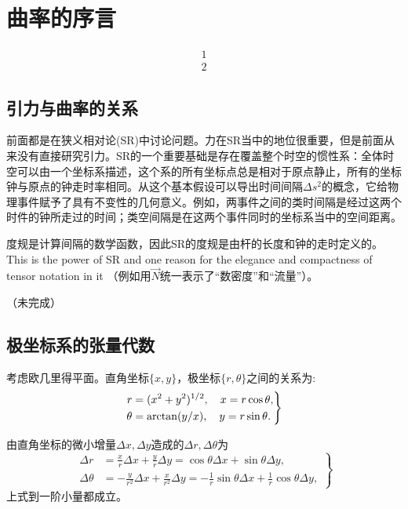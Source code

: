 \chapter{曲率的序言}
\label{chap5}

\begin{align}
    1\\2
\end{align}

\section{引力与曲率的关系}
\label{sec5.1}
前面都是在狭义相对论(SR)中讨论问题。力在SR当中的地位很重要，但是前面从来没有直接研究引力。SR的一个重要基础是存在覆盖整个时空的惯性系：全体时空可以由一个坐标系描述，这个系的所有坐标点总是相对于原点静止，所有的坐标钟与原点的钟走时率相同。从这个基本假设可以导出时间间隔$\Delta s^2$的概念，它给物理事件赋予了具有不变性的几何意义。例如，两事件之间的类时间隔是经过这两个时件的钟所走过的时间；类空间隔是在这两个事件同时的坐标系当中的空间距离。

度规是计算间隔的数学函数，因此SR的度规是由杆的长度和钟的走时定义的。  This is the power of SR and one reason for the elegance and compactness of tensor notation in it （例如用$\vec{N}$统一表示了“数密度”和“流量”）。

（未完成）

\section{极坐标系的张量代数}
\label{sec5.2}
考虑欧几里得平面。直角坐标$\{x, y\}$，极坐标$\{r, \theta\}$之间的关系为:
\begin{equation}
    \left.
    \begin{split}
    r &= (x^2 + y^2)^{1/2}, \quad x = r \cos \theta, \\
    \theta &= \operatorname{\mathrm{arctan}} (y / x), \quad y = r \sin \theta.
    \end{split}
    \right\}
\label{equ5.3}
\end{equation}

由直角坐标的微小增量$\Delta x, \Delta y$造成的$\Delta r, \Delta \theta$为
\begin{equation}
\left.
\begin{split}
    \Delta r &= \frac{x}{r} \Delta x + \frac{y}{r} \Delta y = \cos \theta \Delta x + \sin \theta \Delta y, \\
    \Delta \theta &= -\frac{y}{r^2} \Delta x + \frac{x}{r^2} \Delta y = -\frac{1}{r} \sin \theta \Delta x + \frac{1}{r} \cos \theta \Delta y,
\end{split}
\right\}
\label{equ5.4}
\end{equation}
上式到一阶小量都成立。

